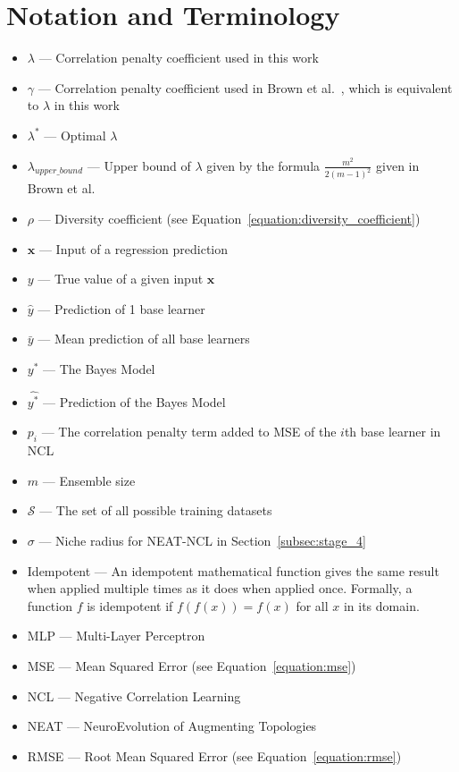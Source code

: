 \newpage
\section*{Notation and Terminology}
\begin{itemize}
    \item $\lambda$ — Correlation penalty coefficient used in this work
    \item $\gamma$ — Correlation penalty coefficient used in Brown et al.\ \cite{brown2005managing}, which is equivalent to $\lambda$ in this work
    \item $\lambda^*$ — Optimal $\lambda$
    \item $\lambda_{upper\_bound}$ — Upper bound of $\lambda$ given by the formula $\frac{m^2}{2(m - 1)^2}$ given in Brown et al.\ \cite{brown2005managing}
    \item $\rho$ — Diversity coefficient (see Equation~\ref{equation:diversity_coefficient})
    \item $\mathbf{x}$ — Input of a regression prediction
    \item $y$ — True value of a given input $\mathbf{x}$
    \item $\hat{y}$ — Prediction of 1 base learner
    \item $\bar{y}$ — Mean prediction of all base learners
    \item $y^*$ — The Bayes Model
    \item $\hat{y^*}$ — Prediction of the Bayes Model
    \item $p_i$ — The correlation penalty term added to MSE of the $i$th base learner in NCL
    \item $m$ — Ensemble size
    \item $\mathcal{S}$ — The set of all possible training datasets
    \item $\sigma$ — Niche radius for NEAT-NCL in Section~\ref{subsec:stage_4}
    \item Idempotent — An idempotent mathematical function gives the same result when applied multiple times as it does when applied once. Formally, a function $f$ is idempotent if $f(f(x)) = f(x)$ for all $x$ in its domain. 
    \item MLP — Multi-Layer Perceptron
    \item MSE — Mean Squared Error (see Equation~\ref{equation:mse})
    \item NCL — Negative Correlation Learning
    \item NEAT — NeuroEvolution of Augmenting Topologies
    \item RMSE — Root Mean Squared Error (see Equation~\ref{equation:rmse})
\end{itemize}
\newpage